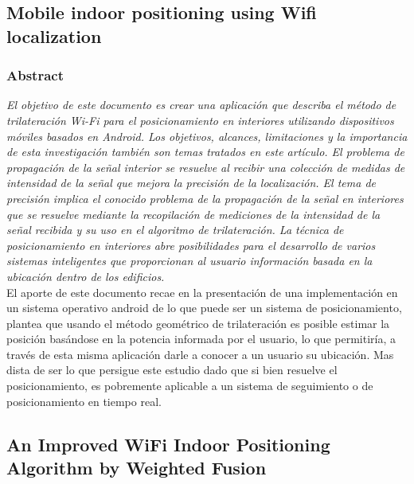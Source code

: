 \subsection{Mobile indoor positioning using Wifi localization}
\subsubsection{Abstract}
\emph{El objetivo de este documento es crear una aplicación que describa el método de trilateración Wi-Fi para el posicionamiento en interiores utilizando dispositivos móviles basados en Android. Los objetivos, alcances, limitaciones y la importancia de esta investigación también son temas tratados en este artículo. El problema de propagación de la señal interior se resuelve al recibir una colección de medidas de intensidad de la señal que mejora la precisión de la localización. El tema de precisión implica el conocido problema de la propagación de la señal en interiores que se resuelve mediante la recopilación de mediciones de la intensidad de la señal recibida y su uso en el algoritmo de trilateración. La técnica de posicionamiento en interiores abre posibilidades para el desarrollo de varios sistemas inteligentes que proporcionan al usuario información basada en la ubicación dentro de los edificios.}\\

El aporte de este documento recae en la presentación de una implementación en un sistema operativo android de lo que puede ser un sistema de posicionamiento, plantea que usando el método geométrico de trilateración es posible estimar la posición basándose en la potencia informada por el usuario, lo que permitiría, a través de esta misma aplicación darle a conocer a un usuario su ubicación. Mas dista de ser lo que persigue este estudio dado que si bien resuelve el posicionamiento, es pobremente aplicable a un sistema de seguimiento o de posicionamiento en tiempo real.

\subsection{An Improved WiFi Indoor Positioning Algorithm by Weighted Fusion}
